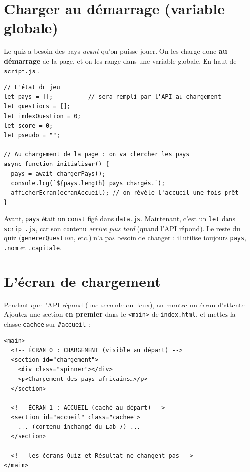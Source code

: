 \documentclass[11pt,a4paper]{article}
\newcommand{\code}[1]{\texttt{#1}}
\begin{document}
\section{Charger au démarrage (variable globale)}

Le quiz a besoin des pays \emph{avant} qu'on puisse jouer. On les charge donc \textbf{au démarrage} de la page, et on les range dans une variable globale. En haut de \code{script.js} :

\begin{lstlisting}[style=js]
// L'état du jeu
let pays = [];          // sera rempli par l'API au chargement
let questions = [];
let indexQuestion = 0;
let score = 0;
let pseudo = "";

// Au chargement de la page : on va chercher les pays
async function initialiser() {
  pays = await chargerPays();
  console.log(`${pays.length} pays chargés.`);
  afficherEcran(ecranAccueil); // on révèle l'accueil une fois prêt
}
\end{lstlisting}

\begin{attentionbox}
Avant, \code{pays} était un \code{const} figé dans \code{data.js}. Maintenant, c'est un \code{let} dans \code{script.js}, car son contenu \emph{arrive plus tard} (quand l'API répond). Le reste du quiz (\code{genererQuestion}, etc.) n'a pas besoin de changer : il utilise toujours \code{pays}, \code{.nom} et \code{.capitale}.
\end{attentionbox}

\section{L'écran de chargement}

Pendant que l'API répond (une seconde ou deux), on montre un écran d'attente. Ajoutez une section \textbf{en premier} dans le \code{<main>} de \code{index.html}, et mettez la classe \code{cachee} sur \code{\#accueil} :

\begin{lstlisting}[style=html]
<main>
  <!-- ÉCRAN 0 : CHARGEMENT (visible au départ) -->
  <section id="chargement">
    <div class="spinner"></div>
    <p>Chargement des pays africains…</p>
  </section>

  <!-- ÉCRAN 1 : ACCUEIL (caché au départ) -->
  <section id="accueil" class="cachee">
    ... (contenu inchangé du Lab 7) ...
  </section>

  <!-- les écrans Quiz et Résultat ne changent pas -->
</main>
\end{lstlisting}
\end{document}
